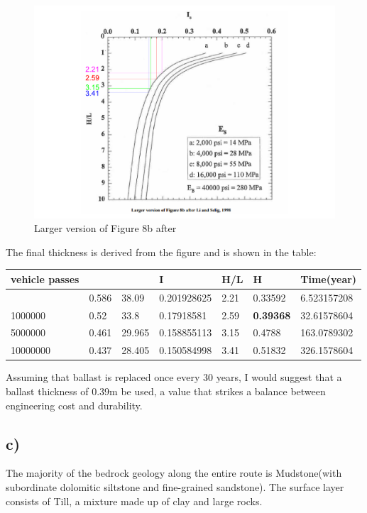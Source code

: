 \documentclass[letterpaper,12pt,leqno]{article}
\begin{document}
	\begin{figure}[H]
		\centering
		\includegraphics[width=\linewidth]{t2.pdf}
		\caption{Larger version of Figure 8b after \cite{LiSelig1998}}
		\label{fig:figure8b}
	\end{figure}
	
	The final thickness is derived from the figure and is shown in the
	table:
	
	\begin{longtable}[]{@{}lllllll@{}}
		\toprule\noalign{}
		vehicle passes & & & I & H/L & H & Time(year) \\
		\midrule\noalign{}
		\endhead
		\bottomrule\noalign{}
		\endlastfoot
		200000 & 0.586 & 38.09 & 0.201928625 & 2.21 & 0.33592 & 6.523157208 \\
		1000000 & 0.52 & 33.8 & 0.17918581 & 2.59 & \textbf{0.39368} & 32.61578604 \\
		5000000 & 0.461 & 29.965 & 0.158855113 & 3.15 & 0.4788 & 163.0789302 \\
		10000000 & 0.437 & 28.405 & 0.150584998 & 3.41 & 0.51832 & 326.1578604 \\
	\end{longtable}
	
	Assuming that ballast is replaced once every 30 years, I would suggest
	that a ballast thickness of 0.39m be used, a value that strikes a
	balance between engineering cost and durability.
	
	\subsection{c)}
	
	The majority of the bedrock geology along the entire route is
	Mudstone(with subordinate dolomitic siltstone and fine-grained
	sandstone). The surface layer consists of Till, a mixture made up of
	clay and large rocks.
	
\end{document}
